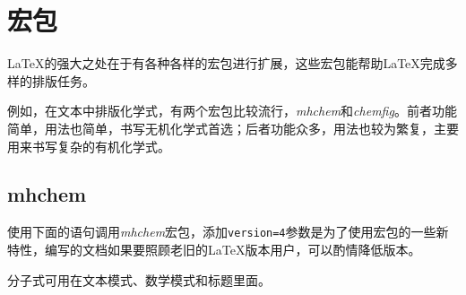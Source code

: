 {\let\clearpage\relax \chapter{宏包}}

\LaTeX 的强大之处在于有各种各样的宏包进行扩展，这些宏包能帮助\LaTeX 完成多样的排版任务。

例如，在文本中排版化学式，有两个宏包比较流行，\emph{mhchem}和\emph{chemfig}。前者功能简单，用法也简单，书写无机化学式首选；后者功能众多，用法也较为繁复，主要用来书写复杂的有机化学式。

\section{mhchem}

使用下面的语句调用\emph{mhchem}宏包，添加\verb|version=4|参数是为了使用宏包的一些新特性，编写的文档如果要照顾老旧的\LaTeX 版本用户，可以酌情降低版本。

\begin{latex}
\usepackage[version=4]{mhchem}
\end{latex}


\begin{codeshow}
\par
{}
\end{codeshow}


分子式可用在文本模式、数学模式和标题里面。

\begin{codeshow}
\par
{}
 \end{codeshow}


\begin{codeshow}
\par
{}\par
\ce{[AgCl2]-}\par
{}\par
{}
\end{codeshow}


\begin{codeshow}
\end{codeshow}


\begin{codeshow}
\par
{}\par
{}\par
{}\par
{}\par
{}
\end{codeshow}

